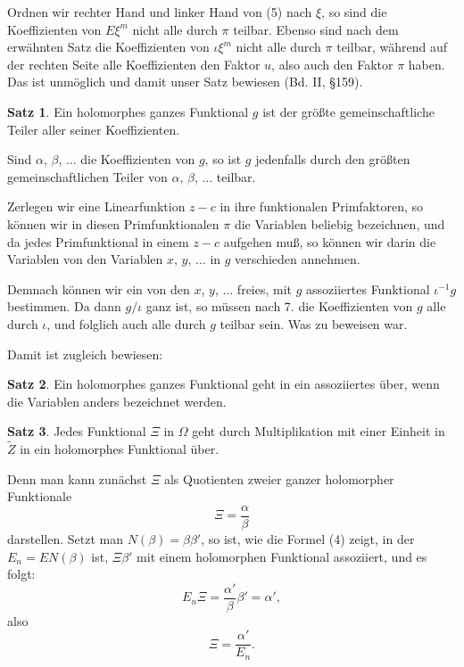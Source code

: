 \documentclass[12pt,a4paper]{article}
\theoremstyle{definition}
\newtheorem{satz}{Satz}[section]
\begin{document}
Ordnen wir rechter Hand und linker Hand von (5) nach $\xi$, so sind die Koeffizienten von $E\xi^m$ nicht alle durch $\pi$ teilbar. Ebenso sind nach dem erwähnten Satz die Koeffizienten von $\iota\xi^m$ nicht alle durch $\pi$ teilbar, während auf der rechten Seite alle Koeffizienten den Faktor $u$, also auch den Faktor $\pi$ haben. Das ist unmöglich und damit unser Satz bewiesen (Bd. II, \S 159).

\begin{satz}
Ein holomorphes ganzes Funktional $g$ ist der größte gemeinschaftliche Teiler aller seiner Koeffizienten.
\end{satz}

Sind $\alpha$, $\beta$, $\ldots$ die Koeffizienten von $g$, so ist $g$ jedenfalls durch den größten gemeinschaftlichen Teiler von $\alpha$, $\beta$, $\ldots$ teilbar.

Zerlegen wir eine Linearfunktion $z - c$ in ihre funktionalen Primfaktoren, so können wir in diesen Primfunktionalen $\pi$ die Variablen beliebig bezeichnen, und da jedes Primfunktional in einem $z - c$ aufgehen muß, so können wir darin die Variablen von den Variablen $x$, $y$, $\ldots$ in $g$ verschieden annehmen.

Demnach können wir ein von den $x$, $y$, $\ldots$ freies, mit $g$ assoziiertes Funktional $\iota^{-1}g$ bestimmen. Da dann $g/\iota$ ganz ist, so müssen nach 7. die Koeffizienten von $g$ alle durch $\iota$, und folglich auch alle durch $g$ teilbar sein. Was zu beweisen war.

Damit ist zugleich bewiesen:

\begin{satz}
Ein holomorphes ganzes Funktional geht in ein assoziiertes über, wenn die Variablen anders bezeichnet werden.
\end{satz}

\begin{satz}
Jedes Funktional $\Xi$ in $\Omega$ geht durch Multiplikation mit einer Einheit in $\tilde{Z}$ in ein holomorphes Funktional über.
\end{satz}
Denn man kann zunächst $\Xi$ als Quotienten zweier ganzer holomorpher Funktionale
\[\Xi = \frac{\alpha}{\beta}\]
darstellen. Setzt man $N(\beta) = \beta\beta'$, so ist, wie die Formel (4) zeigt, in der $E_n = EN(\beta)$ ist, $\Xi\beta'$ mit einem holomorphen Funktional assoziiert, und es folgt:
\begin{equation}
E_n\Xi = \frac{\alpha'}{\beta}\beta' = \alpha',
\end{equation}
also
\begin{equation}
\Xi = \frac{\alpha'}{E_n}.
\end{equation}
\end{document}
